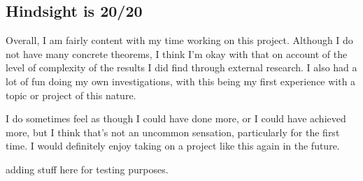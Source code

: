 \documentclass{article}
\begin{document}
\subsection{Hindsight is 20/20}

Overall, I am fairly content with my time working on this project.
Although I do not have many concrete theorems, I think I'm okay with that on account of the level of complexity of the results I did find through external research.
I also had a lot of fun doing my own investigations, with this being my first experience with a topic or project of this nature.

I do sometimes feel as though I could have done more, or I could have achieved more, but I think that's not an uncommon sensation, particularly for the first time.
I would definitely enjoy taking on a project like this again in the future.


\newpage



\newpage
adding stuff here for testing purposes.
\end{document}
